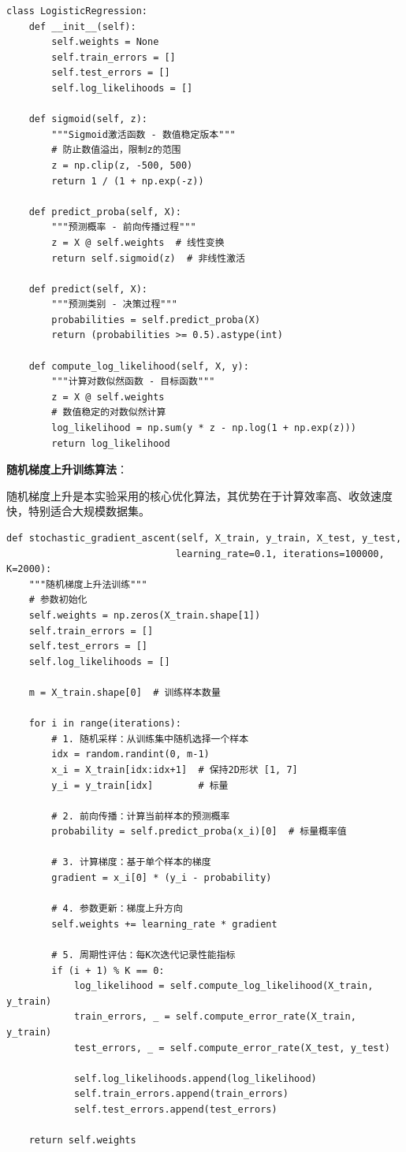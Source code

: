 \documentclass[a4paper]{article}
\begin{document}
\begin{lstlisting}[caption=逻辑回归核心组件实现]
class LogisticRegression:
    def __init__(self):
        self.weights = None
        self.train_errors = []
        self.test_errors = []
        self.log_likelihoods = []
    
    def sigmoid(self, z):
        """Sigmoid激活函数 - 数值稳定版本"""
        # 防止数值溢出，限制z的范围
        z = np.clip(z, -500, 500)
        return 1 / (1 + np.exp(-z))
    
    def predict_proba(self, X):
        """预测概率 - 前向传播过程"""
        z = X @ self.weights  # 线性变换
        return self.sigmoid(z)  # 非线性激活
    
    def predict(self, X):
        """预测类别 - 决策过程"""
        probabilities = self.predict_proba(X)
        return (probabilities >= 0.5).astype(int)
    
    def compute_log_likelihood(self, X, y):
        """计算对数似然函数 - 目标函数"""
        z = X @ self.weights
        # 数值稳定的对数似然计算
        log_likelihood = np.sum(y * z - np.log(1 + np.exp(z)))
        return log_likelihood
\end{lstlisting}

\textbf{随机梯度上升训练算法}：

随机梯度上升是本实验采用的核心优化算法，其优势在于计算效率高、收敛速度快，特别适合大规模数据集。

\begin{lstlisting}[caption=随机梯度上升训练核心算法]
def stochastic_gradient_ascent(self, X_train, y_train, X_test, y_test,
                              learning_rate=0.1, iterations=100000, K=2000):
    """随机梯度上升法训练"""
    # 参数初始化
    self.weights = np.zeros(X_train.shape[1])
    self.train_errors = []
    self.test_errors = []
    self.log_likelihoods = []
    
    m = X_train.shape[0]  # 训练样本数量
    
    for i in range(iterations):
        # 1. 随机采样：从训练集中随机选择一个样本
        idx = random.randint(0, m-1)
        x_i = X_train[idx:idx+1]  # 保持2D形状 [1, 7]
        y_i = y_train[idx]        # 标量
        
        # 2. 前向传播：计算当前样本的预测概率
        probability = self.predict_proba(x_i)[0]  # 标量概率值
        
        # 3. 计算梯度：基于单个样本的梯度
        gradient = x_i[0] * (y_i - probability)
        
        # 4. 参数更新：梯度上升方向
        self.weights += learning_rate * gradient
        
        # 5. 周期性评估：每K次迭代记录性能指标
        if (i + 1) % K == 0:
            log_likelihood = self.compute_log_likelihood(X_train, y_train)
            train_errors, _ = self.compute_error_rate(X_train, y_train)
            test_errors, _ = self.compute_error_rate(X_test, y_test)
            
            self.log_likelihoods.append(log_likelihood)
            self.train_errors.append(train_errors)
            self.test_errors.append(test_errors)
    
    return self.weights
\end{lstlisting}
\end{document}
